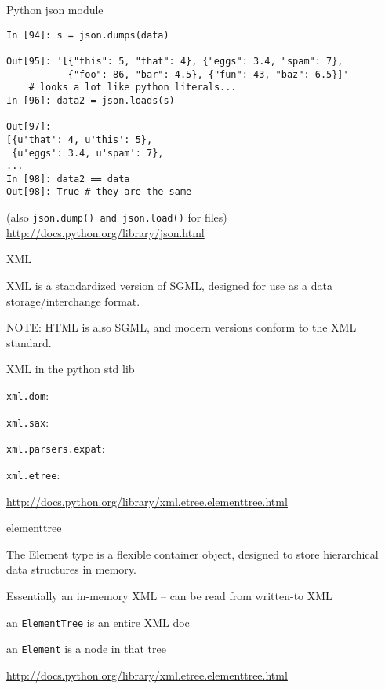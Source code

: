 \documentclass{beamer}
\begin{document}
\begin{frame}[fragile]{Python json module}

{\small
\begin{verbatim}
In [94]: s = json.dumps(data)

Out[95]: '[{"this": 5, "that": 4}, {"eggs": 3.4, "spam": 7},
           {"foo": 86, "bar": 4.5}, {"fun": 43, "baz": 6.5}]'
    # looks a lot like python literals...
In [96]: data2 = json.loads(s)

Out[97]: 
[{u'that': 4, u'this': 5},
 {u'eggs': 3.4, u'spam': 7},
...
In [98]: data2 == data
Out[98]: True # they are the same

\end{verbatim}
}
(also \verb|json.dump() and json.load()| for files)
\vfill
\url{http://docs.python.org/library/json.html}
\end{frame} 



\begin{frame}[fragile]{XML}

\vfill
{\Large XML is a standardized version of SGML, designed for use as a data
        storage/interchange format.}

\vfill
{\Large NOTE: HTML is also SGML, and modern versions conform to the XML standard.}

\end{frame} 

\begin{frame}[fragile]{XML in the python std lib}


\vfill
{\Large \verb|xml.dom|: }

\vfill
{\Large \verb|xml.sax|: }

\vfill
{\Large \verb|xml.parsers.expat|: }

\vfill
{\Large \verb|xml.etree|: }

\url{http://docs.python.org/library/xml.etree.elementtree.html}

\end{frame} 

\begin{frame}[fragile]{elementtree}


\vfill
{\Large  The Element type is a flexible container object, designed to store
hierarchical data structures in memory.}

\vfill
{\Large  Essentially an in-memory XML -- can be read from written-to XML}

\vfill
{\Large an \verb|ElementTree| is an entire XML doc}

\vfill
{\Large an \verb|Element| is a node in that tree}

\vfill
\url{http://docs.python.org/library/xml.etree.elementtree.html}

\end{frame} 
\end{document}

